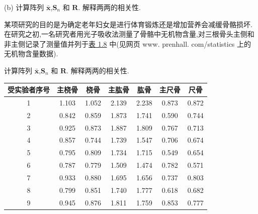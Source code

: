 (b) 计算阵列 $\bar{\bm{x}}$,$\bm{S}_n$ 和 $\bm{R}$. 解释两两的相关性.

 某项研究的目的是为确定老年妇女是进行体育锻炼还是增加营养会减缓骨骼损坏. 在研究之初,一名研究者用光子吸收法测量了骨骼中无机物含量,对三根骨头主侧和非主侧记录了测量值并列于\hyperref[tab:1.8]{表 1.8} 中(见网页 www. prenhall. com/statistics 上的无机物含量数据).

计算阵列 $\bar{\bm{x}}$,$\bm{S}_n$ 和 $\bm{R}$. 解释两两的相关性.

\begin{mvtable}
\label{tab:1.8}
\begin{tabular}{ccccccc}
\toprule
受实验者序号 & 主桡骨 & 桡骨 & 主肱骨 & 肱骨 & 主尺骨 & 尺骨 \\
\midrule
1 & 1.103 & 1.052 & 2.139 & 2.238 & 0.873 & 0.872 \\
2 & 0.842 & 0.859 & 1.873 & 1.741 & 0.590 & 0.744 \\
3 & 0.925 & 0.873 & 1.887 & 1.809 & 0.767 & 0.713 \\
4 & 0.857 & 0.744 & 1.739 & 1.547 & 0.706 & 0.674 \\
5 & 0.795 & 0.809 & 1.734 & 1.715 & 0.549 & 0.654 \\
6 & 0.787 & 0.779 & 1.509 & 1.474 & 0.782 & 0.571 \\
7 & 0.933 & 0.880 & 1.695 & 1.656 & 0.737 & 0.803 \\
8 & 0.799 & 0.851 & 1.740 & 1.777 & 0.618 & 0.682 \\
9 & 0.945 & 0.876 & 1.811 & 1.759 & 0.853 & 0.777 \\
\bottomrule
\end{tabular}
\end{mvtable}
